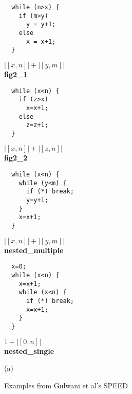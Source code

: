 \documentclass[nocopyrightspace,preprint]{sigplanconf}
\begin{document}
\begin{figure*}[t!]
 \setlength{\progwidth}{.24\linewidth}
  \centering
  \begin{minipage}[b]{\progwidth}
    \begin{center}
   \begin{lstlisting}
  while (n>x) {
    if (m>y) 
      y = y+1;
    else
      x = x+1;
  }
   \end{lstlisting}

$|[x, n]| + |[y, m]|$
\\[.7\baselineskip]
      {\bf fig2\_1}
    \end{center}
  \end{minipage}
%
%
  \begin{minipage}[b]{\progwidth}
    \begin{center}
   \begin{lstlisting}
  while (x<n) {
    if (z>x)
      x=x+1;
    else
      z=z+1;
  }
   \end{lstlisting}

$|[x, n]| + |[z, n]|$
\\[.7\baselineskip]
      {\bf fig2\_2}
    \end{center}
  \end{minipage}
%
%
  \begin{minipage}[b]{\progwidth}
    \begin{center}
   \begin{lstlisting}
  while (x<n) {
    while (y<m) {
      if (*) break;
      y=y+1;
    }
    x=x+1;
  }
   \end{lstlisting}

$|[x, n]| + |[y, m]|$
\\[.7\baselineskip]
      {\bf nested\_multiple}
    \end{center}
  \end{minipage}
%
%
  \begin{minipage}[b]{\progwidth}
    \begin{center}
   \begin{lstlisting}
  x=0;
  while (x<n) {
    x=x+1;
    while (x<n) {
      if (*) break;
      x=x+1;
    }
  }
   \end{lstlisting}

$1 + |[0, n]|$
\\[.7\baselineskip]
      {\bf nested\_single}
    \end{center}
  \end{minipage}

   \caption{Examples from Gulwani et al's SPEED~\cite{GulwaniMC09}} (a)
  \label{fig:cat2a}
\end{figure*}
\end{document}

